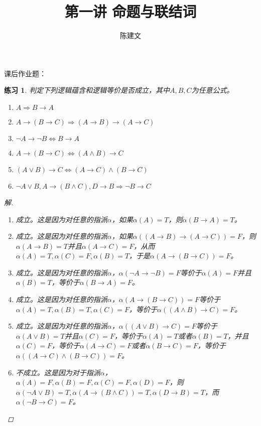 \documentclass{article}
\newtheorem{Exercise}{练习}
\begin{document}
\begin{CJK}{UTF8}{gbsn}
  \title{第一讲 命题与联结词}
  \author{陈建文}
  \maketitle

  课后作业题：
  \begin{Exercise}
    判定下列逻辑蕴含和逻辑等价是否成立，其中$A,B,C$为任意公式。
    \begin{enumerate}
      \item $A\Rightarrow  B\to A$
      \item $A\to (B\to C)\Rightarrow (A\to B)\to (A\to C)$
      \item $\lnot A\to \lnot B\Leftrightarrow B\to A$
      \item $A\to (B\to C)\Leftrightarrow (A\land B)\to C$
      \item $(A\lor B)\to C\Leftrightarrow (A\to C)\land (B\to C)$
      \item $\lnot A\lor B,A\to (B\land C),D\to B\Rightarrow \lnot B\to C$   
    \end{enumerate}

    \begin{proof}[解]
      \begin{enumerate}
        \item 成立。这是因为对任意的指派$\alpha$，如果$\alpha(A)=T$，则$\alpha(B\to A)=T$。
        \item 成立。这是因为对任意的指派$\alpha$，如果$\alpha((A\to B)\to(A\to C))=F$，则$\alpha(A\to B)=T$并且$\alpha(A\to C)=F$，从而$\alpha(A)=T,\alpha(C)=F,\alpha(B)=T$，于是$\alpha(A\to(B\to C))=F$。
        \item 成立。这是因为对任意的指派$\alpha$，$\alpha(\lnot A \to \lnot B)=F$等价于$\alpha(A)=F$并且$\alpha(B)=T$，等价于$\alpha(B\to A)=F$。
        \item 成立。这是因为对任意的指派$\alpha$，$\alpha(A\to(B\to C))=F$等价于$\alpha(A)=T,\alpha(B)=T,\alpha(C)=F$，等价于$\alpha((A\land B)\to C)=F$。
        \item 成立。这是因为对任意的指派$\alpha$，$\alpha((A\lor B)\to C)=F$等价于$\alpha(A\lor B)=T$并且$\alpha(C)=F$，等价于$\alpha(A)=T$或者$\alpha(B)=T$，并且$\alpha(C)=F$，等价于$\alpha(A\to C)=F$或者$\alpha(B\to C)=F$，等价于$\alpha((A\to C)\land (B\to C))=F$。
        \item 不成立。这是因为对于指派$\alpha$，$\alpha(A)=F,\alpha(B)=F,\alpha(C)=F,\alpha(D)=F$，则$\alpha(\lnot A\lor B)=T,\alpha(A\to (B\land C))=T,\alpha(D\to B)=T$，而$\alpha(\lnot B\to C)=F$。
      \end{enumerate}
    \end{proof}
  \end{Exercise}
  

\end{CJK}
\end{document}
